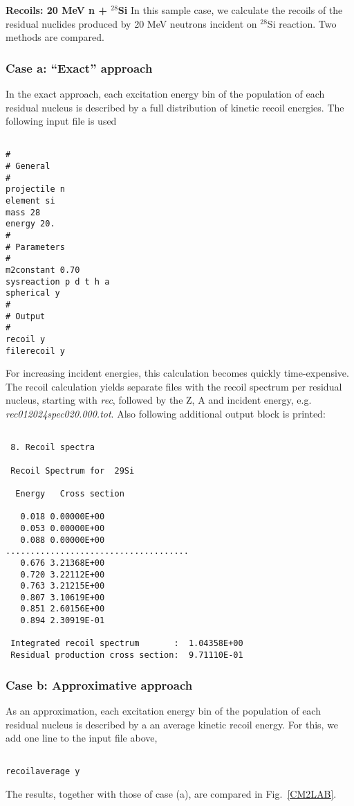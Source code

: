 \begin{samplecase}
{\bf Recoils: 20 MeV  n + ${}^{28}$Si}\newline
In this sample case, we calculate the recoils of the residual nuclides
produced by 20 MeV neutrons incident on ${}^{28}$Si reaction. Two methods are
compared.
\subsubsection{Case a: ``Exact'' approach}
In the exact approach, each excitation energy bin of the population of each
residual nucleus is described by a full distribution of kinetic recoil
energies.
The following input file is used


{\small \begin{verbatim}

#
# General
#
projectile n
element si
mass 28
energy 20.
#
# Parameters
#
m2constant 0.70
sysreaction p d t h a
spherical y
#
# Output
#
recoil y
filerecoil y
\end{verbatim} } \renewcommand{\baselinestretch}{1.07}\small\normalsize
\noindent
For increasing incident energies, this calculation becomes quickly
time-expensive.
The recoil calculation yields separate files with the recoil spectrum per
residual nucleus, starting with {\it rec}, followed by the Z, A and incident
energy, e.g. {\em rec012024spec020.000.tot}. Also following additional
output block is printed:

{\small \begin{verbatim}

 8. Recoil spectra

 Recoil Spectrum for  29Si

  Energy   Cross section

   0.018 0.00000E+00
   0.053 0.00000E+00
   0.088 0.00000E+00
.....................................
   0.676 3.21368E+00
   0.720 3.22112E+00
   0.763 3.21215E+00
   0.807 3.10619E+00
   0.851 2.60156E+00
   0.894 2.30919E-01

 Integrated recoil spectrum       :  1.04358E+00
 Residual production cross section:  9.71110E-01
\end{verbatim} } \renewcommand{\baselinestretch}{1.07}\small\normalsize


\subsubsection{Case b: Approximative approach}
As an approximation, each excitation energy bin of the population of each
residual nucleus is described by a an average kinetic recoil energy.
For this, we add one line to the input file above,
{\small \begin{verbatim}

recoilaverage y
\end{verbatim} } \renewcommand{\baselinestretch}{1.07}\small\normalsize
\noindent
The results, together with those of case (a), are compared in
Fig.~\ref{CM2LAB}.
\end{samplecase}
